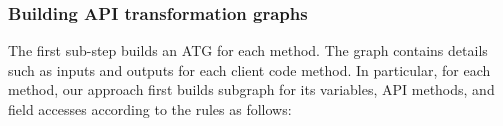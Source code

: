 \subsubsection{Building API transformation graphs} The first sub-step
builds an ATG for each method. The graph contains details such as
inputs and outputs for each client code method. In particular, for
each method, our approach first builds subgraph for its variables,
API methods, and field accesses according to the rules as follows:




%



